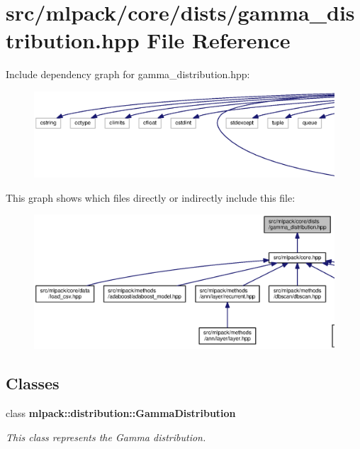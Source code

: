 \section{src/mlpack/core/dists/gamma\+\_\+distribution.hpp File Reference}
\label{gamma__distribution_8hpp}
Include dependency graph for gamma\+\_\+distribution.\+hpp\+:
\nopagebreak
\begin{figure}[H]
\begin{center}
\leavevmode
\includegraphics[width=350pt]{gamma__distribution_8hpp__incl}
\end{center}
\end{figure}
This graph shows which files directly or indirectly include this file\+:
\nopagebreak
\begin{figure}[H]
\begin{center}
\leavevmode
\includegraphics[width=350pt]{gamma__distribution_8hpp__dep__incl}
\end{center}
\end{figure}
\subsection*{Classes}
\begin{DoxyCompactItemize}
\item 
class {\bf mlpack\+::distribution\+::\+Gamma\+Distribution}
\begin{DoxyCompactList}\small\item\em This class represents the Gamma distribution. \end{DoxyCompactList}\end{DoxyCompactItemize}
